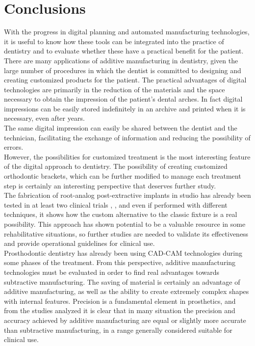 
\chapter{Conclusions} %

\label{Conclusions} %

 
 
With the progress in digital planning and automated manufacturing technologies, it is useful to know how these tools can be integrated into the practice of dentistry and to evaluate whether these have a practical benefit for the patient.\\
There are many applications of additive manufacturing in dentistry, given the large number of procedures in which the dentist is committed to designing and creating customized products for the patient. The practical advantages of digital technologies are primarily in the reduction of the materials and the space necessary to obtain the impression of the patient's dental arches. In fact digital impressions can be easily stored indefinitely in an archive and printed when it is necessary, even after years. \\
The same digital impression can easily be shared between the dentist and the technician, facilitating the exchange of information and reducing the possibility of errors.\\
However, the possibilities for customized treatment is the most interesting feature of the digital approach to dentistry. The possibility of creating customized orthodontic brackets, which can be further modified to manage each treatment step is certainly an interesting perspective that deserves further study. \\ The fabrication of root-analog post-extractive implants in studio has already been tested in at least two clinical trials \parencite{Reference85}, \parencite{Reference87}, and even if performed with different techniques, it shows how the custom alternative to the classic fixture is a real possibility. This approach has shown potential to be a valuable resource in some rehabilitative situations, so further studies are needed to validate its effectiveness and provide operational guidelines for clinical use.\\
Prosthodontic dentistry has already been using CAD-CAM technologies during some phases of the treatment. From this perspective, additive manufacturing technologies must be evaluated in order to find real advantages towards subtractive manufacturing. The saving of material is certainly an advantage of additive manufacturing, as well as the ability to create extremely complex shapes with internal features. Precision is a fundamental element in prosthetics, and from the studies analyzed it is clear that in many situation the precision and accuracy achieved by additive manufacturing are equal or slightly more accurate than subtractive  manufacturing, in a range generally considered suitable for clinical use. \\
